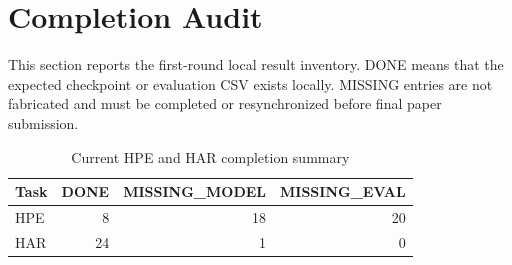 \section{Completion Audit}
This section reports the first-round local result inventory. DONE means that the expected checkpoint or evaluation CSV exists locally. MISSING entries are not fabricated and must be completed or resynchronized before final paper submission.
\begin{table}[htbp]\centering\caption{Current HPE and HAR completion summary}\begin{tabular}{lrrr}\toprule
Task & DONE & MISSING\_MODEL & MISSING\_EVAL\\\midrule
HPE & 8 & 18 & 20\\
HAR & 24 & 1 & 0\\
\bottomrule\end{tabular}\end{table}
